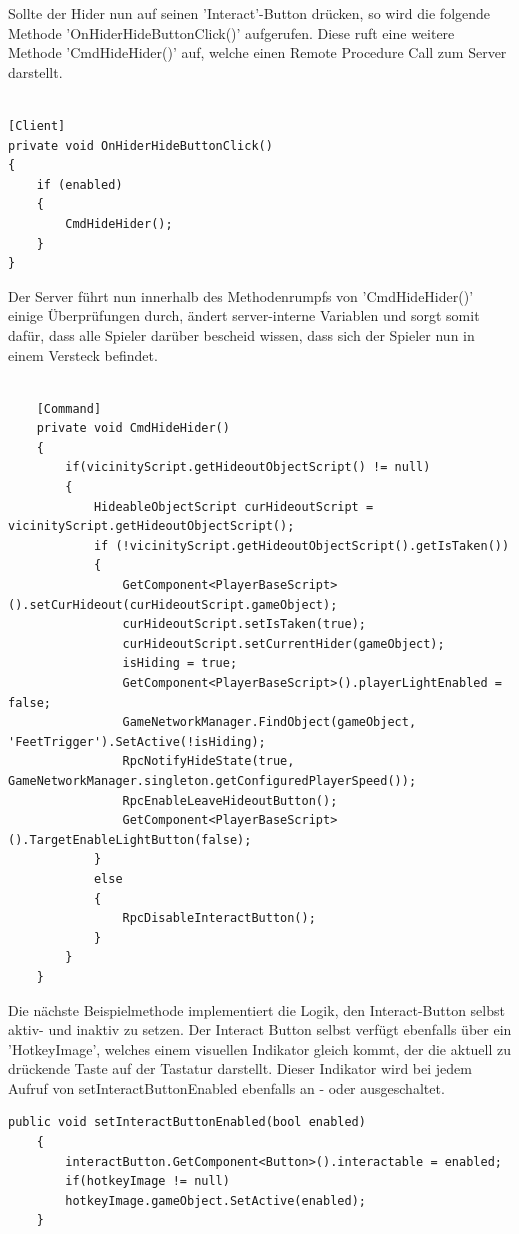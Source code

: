 Sollte der Hider nun auf seinen 'Interact'-Button drücken, so wird die folgende Methode 'OnHiderHideButtonClick()' aufgerufen. Diese ruft eine weitere Methode 'CmdHideHider()' auf, welche einen Remote Procedure Call\cite{.05.02.2022} zum Server darstellt.

\begin{lstlisting}[caption= HiderScript.csOnHiderHideButtonClick() Method]

[Client]
private void OnHiderHideButtonClick()
{
	if (enabled)
	{
		CmdHideHider();
	}
}

\end{lstlisting}

Der Server führt nun innerhalb des Methodenrumpfs von 'CmdHideHider()' einige Überprüfungen durch, ändert server-interne Variablen und sorgt somit dafür, dass alle Spieler darüber bescheid wissen, dass sich der Spieler nun in einem Versteck befindet.

\begin{lstlisting}[caption= HiderScript.cs Subscribe to InGameUiControllerScript Event]
	
	[Command]
	private void CmdHideHider()
	{
		if(vicinityScript.getHideoutObjectScript() != null)
		{
			HideableObjectScript curHideoutScript = vicinityScript.getHideoutObjectScript();
			if (!vicinityScript.getHideoutObjectScript().getIsTaken())
			{
				GetComponent<PlayerBaseScript>().setCurHideout(curHideoutScript.gameObject);
				curHideoutScript.setIsTaken(true);
				curHideoutScript.setCurrentHider(gameObject);
				isHiding = true;
				GetComponent<PlayerBaseScript>().playerLightEnabled = false;
				GameNetworkManager.FindObject(gameObject, 'FeetTrigger').SetActive(!isHiding);
				RpcNotifyHideState(true, GameNetworkManager.singleton.getConfiguredPlayerSpeed());
				RpcEnableLeaveHideoutButton();
				GetComponent<PlayerBaseScript>().TargetEnableLightButton(false);
			}
			else
			{
				RpcDisableInteractButton();
			}
		}
	}	
\end{lstlisting}

Die nächste Beispielmethode implementiert die Logik, den Interact-Button selbst aktiv- und inaktiv zu setzen. Der Interact Button selbst verfügt ebenfalls über ein 'HotkeyImage', welches einem visuellen Indikator gleich kommt, der die aktuell zu drückende Taste auf der Tastatur darstellt. Dieser Indikator wird bei jedem Aufruf von setInteractButtonEnabled ebenfalls an - oder ausgeschaltet.

\begin{lstlisting}[caption= InGameUiControllerScript.cs setInteractButtonEnabled]
public void setInteractButtonEnabled(bool enabled)
	{
		interactButton.GetComponent<Button>().interactable = enabled;
		if(hotkeyImage != null)
		hotkeyImage.gameObject.SetActive(enabled);
	}
\end{lstlisting}

